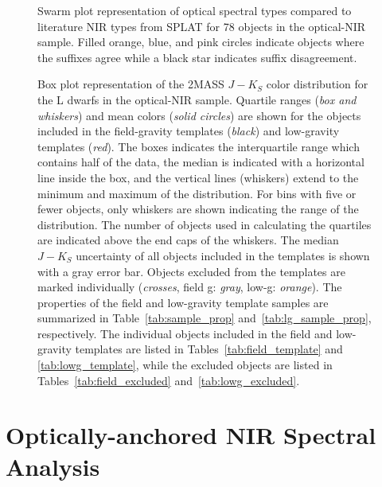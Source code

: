 \documentclass[modern]{aastex61}
\begin{document}
\begin{figure}
  \caption{Swarm plot representation of optical spectral types compared to literature NIR types from SPLAT for 78 objects in the optical-NIR sample.
  Filled orange, blue, and pink circles indicate objects where the suffixes agree while a black star indicates suffix disagreement.}
  \label{fig:opt_lit_nir_comparison}
\end{figure}

\begin{figure}
    \caption{Box plot representation of the 2MASS $J-K_S$ color distribution for the L dwarfs in the optical-NIR sample.
    Quartile ranges (\emph{box and whiskers}) and mean colors (\emph{solid circles}) are shown for the objects included in the field-gravity templates (\emph{black}) and low-gravity templates (\emph{red}).
    The boxes indicates the interquartile range which contains half of the data, the median is indicated with a horizontal line inside the box, and the vertical lines (whiskers) extend to the minimum and maximum of the distribution.
        For bins with five or fewer objects, only whiskers are shown indicating the range of the distribution.
        The number of objects used in calculating the quartiles are indicated above the end caps of the whiskers.
    The median $J-K_S$ uncertainty of all objects included in the templates is shown with a gray error bar.
    Objects excluded from the templates are marked individually (\emph{crosses}, field g: \emph{gray}, low-g: \emph{orange}).
    The properties of the field and low-gravity template samples are summarized in Table~\ref{tab:sample_prop} and~\ref{tab:lg_sample_prop}, respectively. The individual objects included in the field and low-gravity templates are listed in Tables~\ref{tab:field_template} and \ref{tab:lowg_template}, while the excluded objects are listed in Tables~\ref{tab:field_excluded} and~\ref{tab:lowg_excluded}.}
  \label{fig:JK_colors}
\end{figure}
\clearpage

\section{Optically-anchored NIR Spectral Analysis}
\end{document}

